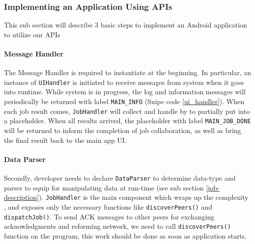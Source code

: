 \documentclass[conference]{IEEEtran}
\begin{document}
\subsubsection{Implementing an Application Using APIs}

This sub section will describe 3 basic steps to implement an Android application to utilize our APIs

\paragraph{Message Handler}

The Message Handler is required to instantiate at the beginning. In particular, an instance of \texttt{UIHandler} is initiated to receive messages from system when it goes into runtime. While system is in progress, the log and information messages will periodically be returned with label \texttt{MAIN\_INFO} (Snipe code \ref{ui_handler}). When each job result comes, \texttt{JobHandler} will collect and handle by  to partially put into a placeholder. When all results arrived, the placeholder with label \texttt{MAIN\_JOB\_DONE} will be returned to inform the completion of job collaboration, as well as bring the final result back to the main app UI.\\

\noindent {}

\paragraph{Data Parser}

Secondly, developer needs to declare \texttt{DataParser} to determine data-type and parser to equip for manipulating data at run-time (see sub section \ref{job-description}). \texttt{JobHandler} is the main component which wraps up the complexity , and exposes only the necessary functions like \texttt{discoverPeers()} and \texttt{dispatchJob()}. To send ACK messages to other peers for exchanging acknowledgments and reforming network, we need to call \texttt{discoverPeers()} function on the program, this work should be done as soon as application starts.\\
\end{document}

